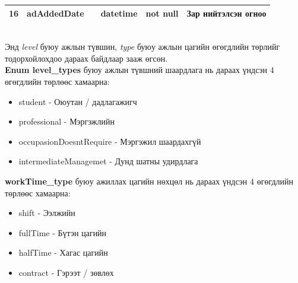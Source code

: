 \begin{table}[h]
\begin{tabular}{|l|l|c|c|c|l|}
      16                               & adAddedDate                               &                                                                     & datetime                                                            & not null                                                        & Зар нийтэлсэн огноо                                                                               \\ \hline
      \end{tabular}
\end{table}
\\Энд \textit{level} буюу ажлын түвшин, \textit{type} буюу ажлын цагийн өгөгдлийн төрлийг тодорхойлохдоо дараах байдлаар зааж өгсөн.
\\\textbf{Enum level\_types} буюу ажлын түвшний шаардлага нь дараах үндсэн 4 өгөгдлийн төрлөөс хамаарна:
\begin{itemize}
  \item student - Оюутан / дадлагажигч
  \item professional - Мэргэжлийн
  \item occupasionDoesntRequire - Мэргэжил шаардахгүй
  \item intermediateManagemet - Дунд шатны удирдлага
\end{itemize}
\textbf{workTime\_type} буюу ажиллах цагийн нөхцөл нь дараах үндсэн 4 өгөгдлийн төрлөөс хамаарна:
\begin{itemize}
  \item shift - Ээлжийн
  \item fullTime - Бүтэн цагийн
  \item halfTime - Хагас цагийн
  \item contract - Гэрээт / зөвлөх
\end{itemize}

